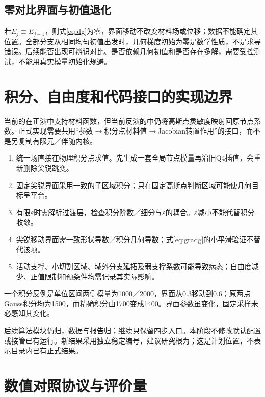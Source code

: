 \documentclass[11pt,a4paper]{ctexart}
\begin{document}
\subsection{零对比界面与初值退化}
若$E_j\equiv E_{j+1}$，则式\eqref{eq:dg}为零，界面移动不改变材料场或位移；数据不能确定其位置。全部分支从相同均匀初值出发时，几何梯度初始为零是数学性质，不是求导错误。后续能否出现可辨识对比、是否依赖几何初值和是否存在多解，需要受控测试，不能用真实模量初始化规避。

\section{积分、自由度和代码接口的实现边界}
当前的在正演中支持材料函数，但当前反演的中仍将高斯点灵敏度映射回原节点系数。正式实现需要共用“参数$\rightarrow$积分点材料值$\rightarrow$Jacobian转置作用”的接口，而不是另复制有限元／伴随内核。

\begin{enumerate}
\item 统一场直接在物理积分点求值。先生成一套全局节点模量再沿旧Q4插值，会重新删除尖锐跳变。
\item 固定尖锐界面采用一致的子区域积分；只在固定高斯点判断区域可能使几何目标呈平台。
\item 有限$\varepsilon$时需解析过渡层，检查积分阶数／细分与$\varepsilon$的耦合。$\varepsilon$减小不能代替积分收敛。
\item 尖锐移动界面需一致形状导数／积分几何导数；式\eqref{eq:gradg}的小平滑验证不替代该项。
\item 活动支撑、小切割区域、域外分支延拓及弱支撑系数可能导致病态；自由度减少、正值限制和预条件均需记录其实际影响。
\end{enumerate}
一个积分反例是单位区间两侧模量为1000／2000，界面从0.3移动到0.6；原两点Gauss积分均为1500，而精确积分由1700变成1400。界面参数虽变化，固定采样未必感知其变化。

后续算法模块仍归，数据与报告归；继续只保留四步入口。本阶段不修改默认配置或接管已有运行。新结果采用独立稳定编号，建议研究根为；这是计划位置，不表示目录内已有正式结果。

\section{数值对照协议与评价量}
\end{document}
